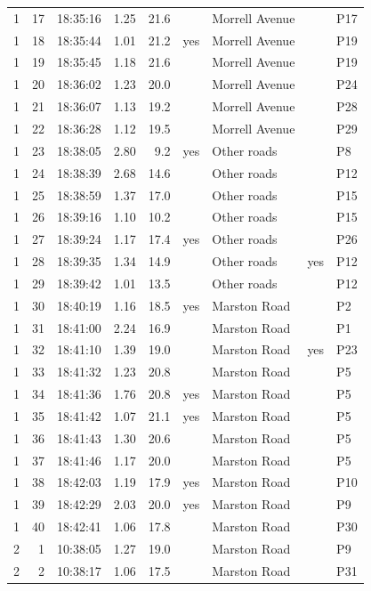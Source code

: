 \begin{longtable}{@{}rrlrrllll@{}}
1 & 17 & 18:35:16 & 1.25 & 21.6 &  & Morrell Avenue &  & P17 \\
1 & 18 & 18:35:44 & 1.01 & 21.2 & yes & Morrell Avenue &  & P19 \\
1 & 19 & 18:35:45 & 1.18 & 21.6 &  & Morrell Avenue &  & P19 \\
1 & 20 & 18:36:02 & 1.23 & 20.0 &  & Morrell Avenue &  & P24 \\
1 & 21 & 18:36:07 & 1.13 & 19.2 &  & Morrell Avenue &  & P28 \\
1 & 22 & 18:36:28 & 1.12 & 19.5 &  & Morrell Avenue &  & P29 \\
1 & 23 & 18:38:05 & 2.80 & 9.2 & yes & Other roads &  & P8 \\
1 & 24 & 18:38:39 & 2.68 & 14.6 &  & Other roads &  & P12 \\
1 & 25 & 18:38:59 & 1.37 & 17.0 &  & Other roads &  & P15 \\
1 & 26 & 18:39:16 & 1.10 & 10.2 &  & Other roads &  & P15 \\
1 & 27 & 18:39:24 & 1.17 & 17.4 & yes & Other roads &  & P26 \\
1 & 28 & 18:39:35 & 1.34 & 14.9 &  & Other roads & yes & P12 \\
1 & 29 & 18:39:42 & 1.01 & 13.5 &  & Other roads &  & P12 \\
1 & 30 & 18:40:19 & 1.16 & 18.5 & yes & Marston Road &  & P2 \\
1 & 31 & 18:41:00 & 2.24 & 16.9 &  & Marston Road &  & P1 \\
1 & 32 & 18:41:10 & 1.39 & 19.0 &  & Marston Road & yes & P23 \\
1 & 33 & 18:41:32 & 1.23 & 20.8 &  & Marston Road &  & P5 \\
1 & 34 & 18:41:36 & 1.76 & 20.8 & yes & Marston Road &  & P5 \\
1 & 35 & 18:41:42 & 1.07 & 21.1 & yes & Marston Road &  & P5 \\
1 & 36 & 18:41:43 & 1.30 & 20.6 &  & Marston Road &  & P5 \\
1 & 37 & 18:41:46 & 1.17 & 20.0 &  & Marston Road &  & P5 \\
1 & 38 & 18:42:03 & 1.19 & 17.9 & yes & Marston Road &  & P10 \\
1 & 39 & 18:42:29 & 2.03 & 20.0 & yes & Marston Road &  & P9 \\
1 & 40 & 18:42:41 & 1.06 & 17.8 &  & Marston Road &  & P30 \\
\midrule
2 & 1 & 10:38:05 & 1.27 & 19.0 &  & Marston Road &  & P9 \\
2 & 2 & 10:38:17 & 1.06 & 17.5 &  & Marston Road &  & P31 \\

\end{longtable}
